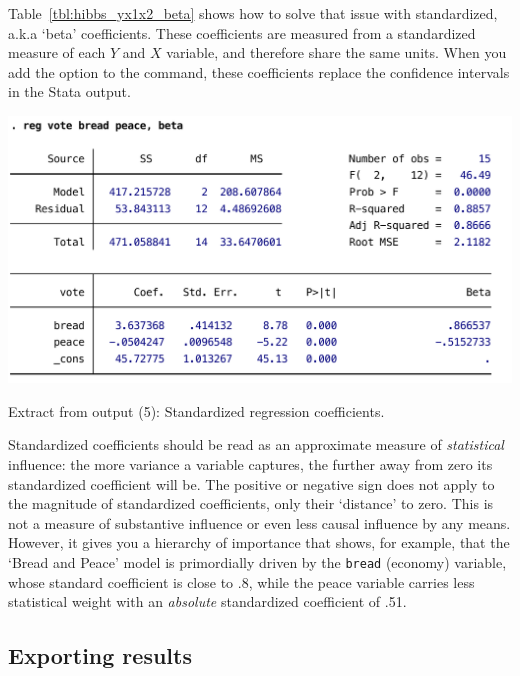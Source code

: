 	Table~\ref{tbl:hibbs_yx1x2_beta} shows how to solve that issue with standardized, a.k.a `beta' coefficients. These coefficients are measured from a standardized measure of each $Y$ and $X$ variable, and therefore share the same units. When you add the  option to the  command, these coefficients replace the confidence intervals in the Stata output.

	\begin{table}[htp]
		\includegraphics[scale=.5]{images/hibbs_yx1x2_beta.pdf}

	  	\caption[Extract from  output (5): Standardized regression coefficients]{\label{tbl:hibbs_yx1x2_beta}
		Extract from  output (5): Standardized regression coefficients.\\
		\hibbs}
	\end{table}%
	
	Standardized coefficients should be read as an approximate measure of \emph{statistical} influence: the more variance a variable captures, the further away from zero its standardized coefficient will be. The positive or negative sign does not apply to the magnitude of standardized coefficients, only their `distance' to zero. This is not a measure of substantive influence or even less causal influence by any means. However, it gives you a hierarchy of importance that shows, for example, that the `Bread and Peace' model is primordially driven by the \texttt{bread} (economy) variable, whose standard coefficient is close to .8, while the peace variable carries less statistical weight with an \emph{absolute} standardized coefficient of .51.
  
	\subsection{Exporting results}

